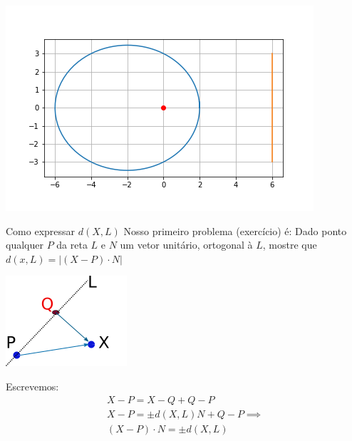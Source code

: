 \documentclass{beamer}
\begin{document}
\begin{frame}
  \includegraphics{conica4.png}
\end{frame}


\begin{frame}{Como expressar $d(X,L)$}
 Nosso primeiro problema (exercício) é: Dado ponto qualquer $P$ da reta $L$ e 
 $N$ um vetor unitário, ortogonal à $L$, mostre que $d(x,L)=|(X-P)\cdot N|$
\begin{center}
  \includegraphics{reta2.png}
\end{center}


\end{frame}
\begin{frame}

  

\end{frame} 

\begin{frame}

  Escrevemos:
  \begin{gather*}
    X-P = X-Q + Q-P \\
    X-P = \pm d(X,L)N+ Q-P \implies \\
    (X-P)\cdot N = \pm d(X,L) 
  \end{gather*}
\end{frame}
\end{document}
